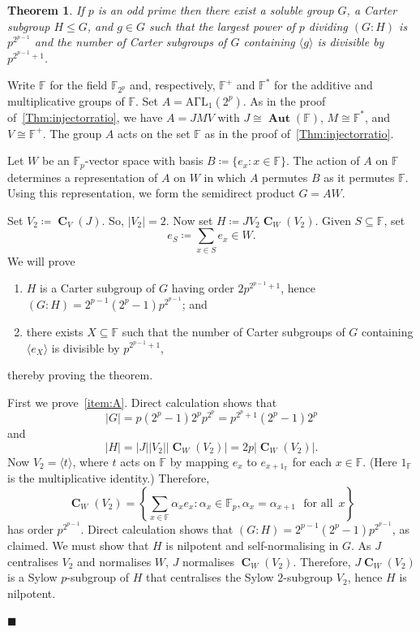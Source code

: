 \documentclass[a4paper,12pt,reqno]{amsart}
\newtheorem{prevtheorem}{Theorem}
\numberwithin{equation}{section}
\DeclareMathOperator{\cent}{\mathbf{C}}
\DeclareMathOperator{\aut}{\mathbf{Aut}}
\renewcommand{\leq}{\leqslant}
\newenvironment{proofof}{{\bf {Proof.} }}{\hfill $\blacksquare$ \\}
\def\ff{{\mathbb F}}
\begin{document}
\begin{prevtheorem}\label{Thm:CountrexampleDivisibilityCart}
If $p$ is an odd prime then there exist a soluble group $G$, 
a Carter subgroup $H \leq G$, and $g \in G$ 
such that the largest power of $p$ dividing $(G : H)$ is $p^{2^{p-1}}$ and the number of Carter subgroups of $G$ containing $\langle g \rangle$ is divisible by $p^{2^{p-1}+1}$.
\end{prevtheorem}

\begin{proofof}
Write $\ff$ for the field $\ff_{2^p}$ and, respectively, 
$\ff^+$ and $\ff^\ast$ for the additive and multiplicative groups of $\ff$.  
Set $A = \mathrm{A\Gamma L}_1(2^p)$.  
As in the proof of~\autoref{Thm:injectorratio}, we have $A = JMV$ with 
$J \cong \aut(\ff)$, $M \cong \ff^\ast$, and $V \cong \ff^+$.  
The group $A$ acts on the set $\ff$ as in the proof of~\autoref{Thm:injectorratio}.

Let $W$ be an $\ff_p$-vector space with basis $B \coloneqq \{e_x : x \in \ff\}$.  
The action of $A$ on $\ff$ determines a representation of $A$ on $W$ 
in which $A$ permutes $B$ as it permutes $\ff$.  
Using this representation, we form the semidirect product $G = AW$.  

Set $V_2 \coloneqq \cent_V(J)$.  
So, $|V_2| = 2$.  
Now set $H \coloneqq J V_2 \cent_W(V_2)$.  
Given $S \subseteq \ff$, set
\[
e_S \coloneqq \sum_{x \in S}e_x \in W.
\]
We will prove 
\begin{enumerate}[label={\upshape(\Alph*)}]
\item\label{item:A} $H$ is a Carter subgroup of $G$ having order $2p^{2^{p-1}+1}$, hence $(G : H) = 2^{p-1}(2^p-1)p^{2^{p-1}}$; and
\item\label{item:B} there exists $X \subseteq \ff$ such that 
the number of Carter subgroups of $G$ containing $\langle e_X \rangle$ 
is divisible by $p^{2^{p-1}+1}$,
\end{enumerate}
thereby proving the theorem.

First we prove~\ref{item:A}.  
Direct calculation shows that
\begin{equation}\label{Eq:gorder}
|G| = p(2^p-1)2^pp^{2^p}=p^{2^p+1}(2^p-1)2^p
\end{equation}
and 
\begin{equation}\label{Eq:horder}
|H| = |J||V_2||\cent_W(V_2)| = 2p|\cent_W(V_2)|.
\end{equation}
Now $V_2=\langle t \rangle$, where $t$ acts on $\ff$ by mapping $e_x$ to $e_{x+1_\ff}$ for each $x \in \ff$.  
(Here $1_\ff$ is the multiplicative identity.)  
Therefore,
\[
\cent_W(V_2) = 
\left\{\sum_{x \in \ff}\alpha_xe_x : \alpha_x \in \ff_p, \alpha_x = \alpha_{x+1}\,\, \mbox{ for all }\, x \right\}
\]
has order $p^{2^{p-1}}$.  
Direct calculation shows that $(G : H) = 2^{p-1}(2^p-1)p^{2^{p-1}}$, as claimed.  
We must show that $H$ is nilpotent and self-normalising in $G$.  
As $J$ centralises $V_2$ and normalises $W$, 
$J$ normalises $\cent_W(V_2)$.  
Therefore, $J \cent_W(V_2)$ is a Sylow $p$-subgroup of $H$ 
that centralises the Sylow $2$-subgroup $V_2$, hence $H$ is nilpotent.  


\end{proofof}
\end{document}
